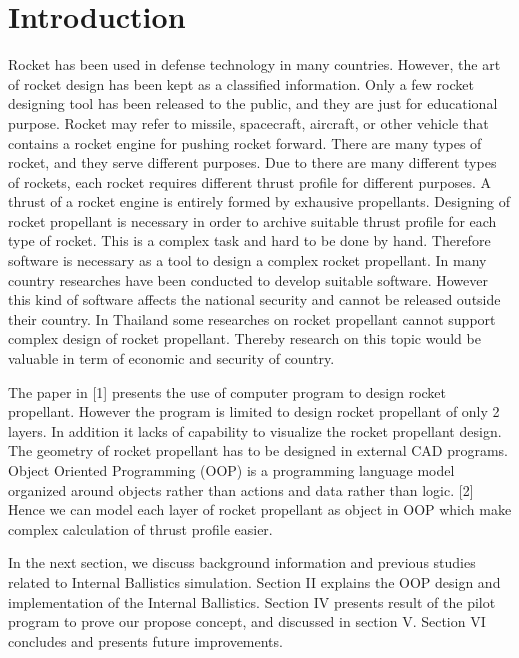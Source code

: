 \documentclass[conference]{IEEEtran}
\begin{document}
\IEEEpeerreviewmaketitle



\section{Introduction}

Rocket has been used in defense technology in many countries. However, the art of rocket design has been kept as a classified information. Only a few rocket designing tool has been released to the public, and they are just for educational purpose. Rocket may refer to missile, spacecraft, aircraft, or other vehicle that contains a rocket engine for pushing rocket forward. There are many types of rocket, and they serve different purposes. Due to there are many different types of rockets, each rocket requires different thrust profile for different purposes. A thrust of a rocket engine is entirely formed by exhausive propellants. Designing of rocket propellant is necessary in order to archive suitable thrust profile for each type of rocket. This is a complex task and hard to be done by hand. Therefore software is necessary as a tool to design a complex rocket propellant. In many country researches have been conducted to develop suitable software. However this kind of software affects the national security and cannot be released outside their country. In Thailand some researches on rocket propellant cannot support complex design of rocket propellant. Thereby research on this topic would be valuable in term of economic and security of country.

The paper in [1] presents the use of computer program to design rocket propellant. However the program is limited to design rocket propellant of only 2 layers. In addition it lacks of capability to visualize the rocket propellant design. The geometry of rocket propellant has to be designed in external CAD programs. Object Oriented Programming (OOP) is a programming language model organized around objects rather than actions and data rather than logic. [2] Hence we can model each layer of rocket propellant as object in OOP which make complex calculation of thrust profile easier.

In the next section, we discuss background information and previous studies related to Internal Ballistics simulation. Section II explains the OOP design and implementation of the Internal Ballistics. Section IV presents result of the pilot program to prove our propose concept, and discussed in section V. Section VI concludes and presents future improvements.
\end{document}
